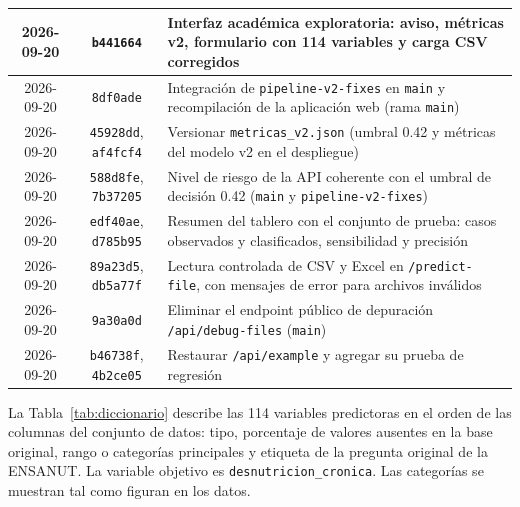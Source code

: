 \begin{longtable}{|c|c|p{9.8cm}|}
  2026-09-20 & \texttt{b441664} & Interfaz académica exploratoria: aviso, métricas v2, formulario con 114 variables y carga CSV corregidos\\ \hline
  2026-09-20 & \texttt{8df0ade} & Integración de \texttt{pipeline-v2-fixes} en \texttt{main} y recompilación de la aplicación web (rama \texttt{main})\\ \hline
  2026-09-20 & \texttt{45928dd}, \texttt{af4fcf4} & Versionar \texttt{metricas\_v2.json} (umbral 0.42 y métricas del modelo v2 en el despliegue)\\ \hline
  2026-09-20 & \texttt{588d8fe}, \texttt{7b37205} & Nivel de riesgo de la API coherente con el umbral de decisión 0.42 (\texttt{main} y \texttt{pipeline-v2-fixes})\\ \hline
  2026-09-20 & \texttt{edf40ae}, \texttt{d785b95} & Resumen del tablero con el conjunto de prueba: casos observados y clasificados, sensibilidad y precisión\\ \hline
  2026-09-20 & \texttt{89a23d5}, \texttt{db5a77f} & Lectura controlada de CSV y Excel en \texttt{/predict-file}, con mensajes de error para archivos inválidos\\ \hline
  2026-09-20 & \texttt{9a30a0d} & Eliminar el endpoint público de depuración \texttt{/api/debug-files} (\texttt{main})\\ \hline
  2026-09-20 & \texttt{b46738f}, \texttt{4b2ce05} & Restaurar \texttt{/api/example} y agregar su prueba de regresión\\ \hline
\end{longtable}
\endgroup


La Tabla~\ref{tab:diccionario} describe las 114 variables predictoras en el orden de las columnas del conjunto de datos: tipo, porcentaje de valores ausentes en la base original, rango o categorías principales y etiqueta de la pregunta original de la ENSANUT. La variable objetivo es \texttt{desnutricion\_cronica}. Las categorías se muestran tal como figuran en los datos.




